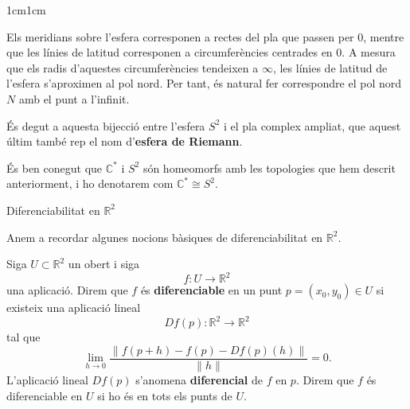 \begin{adjustwidth}{1cm}{1cm}

Els meridians sobre l'esfera corresponen a rectes del pla que passen per $0$, mentre que les línies de latitud corresponen a circumferències centrades en $0$. A mesura que els radis d'aquestes circumferències tendeixen a $\infty$, les línies de latitud de l'esfera s'aproximen al pol nord. Per tant, és natural fer correspondre el pol nord $N$ amb el punt a l'infinit.  

És degut a aquesta bijecció entre l'esfera $S^2$ i el pla complex ampliat, que aquest últim també rep el nom d'\textbf{esfera de Riemann}.

És ben conegut que $\mathbb{C}^*$ i $S^2$ són homeomorfs amb les topologies que hem descrit anteriorment, i ho denotarem com $\mathbb{C}^*\cong S^2$.


\begin{subsection}{Diferenciabilitat en \texorpdfstring{$\mathbb{R}^2$}{C} }

Anem a recordar algunes nocions bàsiques de diferenciabilitat en $\mathbb{R}^2$.

\begin{definicio}
Siga $U\subset \mathbb{R}^2$ un obert i siga
\[
f:U\longrightarrow \mathbb{R}^2
\]
una aplicació. Direm que $f$ és \textbf{diferenciable} en un punt
$p=(x_0,y_0)\in U$ si existeix una aplicació lineal
\[
Df(p):\mathbb{R}^2\longrightarrow \mathbb{R}^2
\]
tal que
\[
\lim_{h\to 0}
\frac{\|f(p+h)-f(p)-Df(p)(h)\|}{\|h\|}=0.
\]
L'aplicació lineal $Df(p)$ s'anomena \textbf{diferencial} de $f$ en $p$.
Direm que $f$ és diferenciable en $U$ si ho és en tots els punts de $U$.
\end{definicio}


\end{subsection}
\end{adjustwidth}
